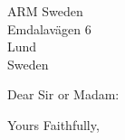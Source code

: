 \documentclass[10pt]{letter}
\begin{document}
\begin{letter}{ARM Sweden\\ Emdalavägen 6\\ Lund\\ Sweden}
\opening{Dear Sir or Madam:}


\closing{Yours Faithfully,}
\end{letter}
\end{document}
